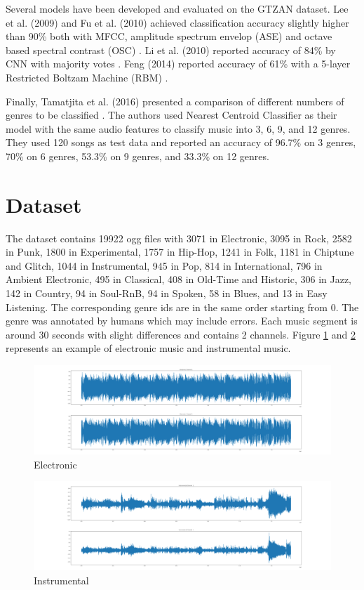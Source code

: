 \documentclass[sigconf ,nonacm]{acmart}
\begin{document}
Several models have been developed and evaluated on the GTZAN dataset. Lee et al. (2009) and Fu et al. (2010) achieved classification accuracy slightly higher than 90\% both with MFCC, amplitude spectrum envelop (ASE) and octave based spectral contrast (OSC) \cite{lee2009automatic,fu2010feature}. Li et al. (2010) reported accuracy of 84\% by CNN with majority votes \cite{li2010automatic}. Feng (2014) reported accuracy of 61\% with a 5-layer Restricted Boltzam Machine (RBM) \cite{feng2014deep}. 


Finally, Tamatjita et al. (2016) presented a comparison of different numbers of genres to be classified \cite{comparison}. The authors used Nearest Centroid Classifier as their model with the same audio features to classify music into 3, 6, 9, and 12 genres. They used 120 songs as test data and reported an accuracy of 96.7\% on 3 genres, 70\% on 6 genres, 53.3\% on 9 genres, and 33.3\% on 12 genres.

\section{Dataset}
The dataset contains 19922 ogg files with 3071 in Electronic, 3095 in Rock, 2582 in Punk, 1800 in Experimental, 1757 in Hip-Hop, 1241 in Folk, 1181 in Chiptune and Glitch, 1044 in Instrumental, 945 in Pop, 814 in International, 796 in Ambient Electronic, 495 in Classical, 408 in Old-Time and Historic, 306 in Jazz, 142 in Country, 94 in Soul-RnB, 94 in Spoken, 58 in Blues, and 13 in Easy Listening. The corresponding genre ids are in the same order starting from 0. The genre was annotated by humans which may include errors. Each music segment is around 30 seconds with slight differences and contains 2 channels. Figure \ref{fig:elec} and \ref{fig:intru} represents an example of electronic music and instrumental music.
\begin{figure}
  \includegraphics[width=\columnwidth]{../figures/overviews/Electronic.png}
  \caption{Electronic}
  \label{fig:elec}
\end{figure}
\begin{figure}
  \includegraphics[width=\columnwidth]{../figures/overviews/Instrumental.png}
  \caption{Instrumental}
  \label{fig:intru}
\end{figure}
\end{document}
